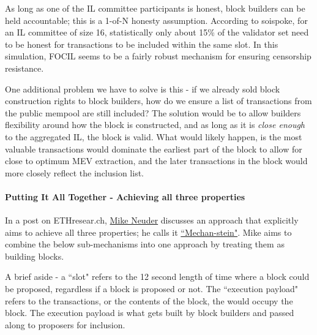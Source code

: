 \documentclass[12pt]{article}
\newcommand{\subsubsubsection}[1]{%
  \paragraph{#1}\mbox{}\par
}
\newenvironment{aside}
  {\begin{mdframed}[style=0,%
      backgroundcolor=fgcolor!5!\thepagecolor,  %
      fontcolor=fgcolor,     %
      leftline=false,rightline=false,leftmargin=2em,rightmargin=2em,%
      innerleftmargin=0pt,innerrightmargin=0pt,linewidth=0.75pt,%
      skipabove=7pt,skipbelow=7pt]\footnotesize}
  {\end{mdframed}}
\begin{document}
As long as one of the IL committee participants is honest, block builders can be held accountable; this is a 1-of-N honesty assumption. According to soispoke, for an IL committee of size 16, statistically only about 15\% of the validator set need to be honest for transactions to be included within the same slot. In this simulation, FOCIL seems to be a fairly robust mechanism for ensuring censorship resistance. 

One additional problem we have to solve is this - if we already sold block construction rights to block builders, how do we ensure a list of transactions from the public mempool are still included? The solution would be to allow builders flexibility around how the block is constructed, and as long as it is \textit{close enough} to the aggregated IL, the block is valid. What would likely happen, is the most valuable transactions would dominate the earliest part of the block to allow for close to optimum MEV extraction, and the later transactions in the block would more closely reflect the inclusion list. 

\subsubsubsection{Putting It All Together - Achieving all three properties}

In a post on ETHresear.ch, \href{https://x.com/mikeneuder}{Mike Neuder} discusses an approach that explicitly aims to achieve all three properties; he calls it \href{https://ethresear.ch/t/mechan-stein-alt-franken-ism/20321}{``Mechan-stein"}. Mike aims to combine the below sub-mechanisms into one approach by treating them as building blocks. 

\begin{aside}
    A brief aside - a ``slot" refers to the 12 second length of time where a block could be proposed, regardless if a block is proposed or not. The ``execution payload" refers to the transactions, or the contents of the block, the would occupy the block. The execution payload is what gets built by block builders and passed along to proposers for inclusion. 
\end{aside}
\end{document}
